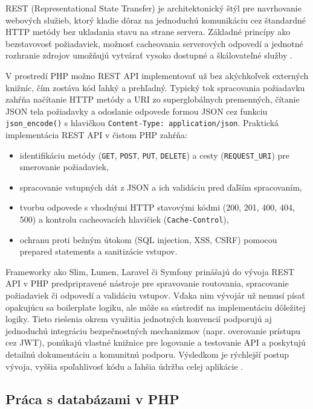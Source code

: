 REST (Representational State Transfer) je architektonický štýl pre navrhovanie webových služieb, ktorý kladie dôraz na 
jednoduchú komunikáciu cez štandardné HTTP metódy bez ukladania stavu na strane servera. Základné princípy ako bezstavovosť 
požiadaviek, možnosť cacheovania serverových odpovedí a jednotné rozhranie zdrojov umožňujú vytvárať vysoko dostupné a 
škálovateľné služby \cite{redhat_rest_api}.

V prostredí PHP možno REST API implementovať už bez akýchkoľvek externých knižníc, čím zostáva kód ľahký a prehľadný. 
Typický tok spracovania požiadavku zahŕňa načítanie HTTP metódy a URI zo superglobálnych premenných, čítanie JSON tela 
požiadavky a odoslanie odpovede formou JSON cez funkciu \texttt{json\_encode()} s hlavičkou 
\texttt{Content-Type: application/json}.  
Praktická implementácia REST API v čistom PHP zahŕňa:
\begin{itemize}
    \item identifikáciu metódy (\texttt{GET}, \texttt{POST}, \texttt{PUT}, \texttt{DELETE}) a cesty (\texttt{REQUEST\_URI}) pre 
  smerovanie požiadaviek,  
    \item spracovanie vstupných dát z JSON a ich validáciu pred ďaľším spracovaním,  
    \item tvorbu odpovede s vhodnými HTTP stavovými kódmi (200, 201, 400, 404, 500) a kontrolu cacheovacích hlavičiek 
  (\texttt{Cache-Control}),  
    \item ochranu proti bežným útokom (SQL injection, XSS, CSRF) pomocou prepared statements a sanitizácie vstupov.
\end{itemize}
Frameworky ako Slim, Lumen, Laravel či Symfony prinášajú do vývoja REST API v PHP predpripravené nástroje pre spravovanie 
routovania, spracovanie požiadaviek či odpovedí a validáciu vstupov. Vďaka nim vývojár už nemusí písať opakujúcu sa boilerplate 
logiku, ale môže sa sústrediť na implementáciu dôležitej logiky. Tieto riešenia okrem využitia jednotných konvencií podporujú 
aj jednoduchú integráciu bezpečnostných mechanizmov (napr. overovanie prístupu cez JWT), ponúkajú vlastné knižnice pre logovanie 
a testovanie API a poskytujú detailnú dokumentáciu a komunitnú podporu. Výsledkom je rýchlejší postup vývoja, vyššia spoľahlivosť 
kódu a ľahšia údržba celej aplikácie \cite{wpwebinfotech_simple_rest_php}.

\subsection{Práca s databázami v PHP}
\label{subsec:pracasdbvphp}

